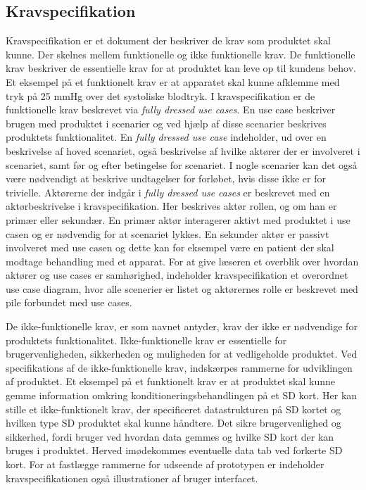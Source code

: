 	\subsection{Kravspecifikation} \label{title:kravspecifikation}
	Kravspecifikation er et dokument der beskriver de krav som produktet skal kunne. Der skelnes mellem funktionelle og ikke funktionelle krav. De funktionelle krav beskriver de essentielle krav for at produktet kan leve op til kundens behov. Et eksempel på et funktionelt krav er at apparatet skal kunne afklemme med tryk på 25 mmHg over det systoliske blodtryk. I kravspecifikation er de funktionelle krav beskrevet via \textit{fully dressed use cases}. En use case beskriver brugen med produktet i scenarier og ved hjælp af disse scenarier beskrives produktets funktionalitet. En \textit{fully dressed use case} indeholder, ud over en beskrivelse af hoved scenariet, også beskrivelse af hvilke aktører der er involveret i scenariet, samt før og efter betingelse for scenariet. I nogle scenarier kan det også være nødvendigt at beskrive undtagelser for forløbet, hvis disse ikke er for trivielle. Aktørerne der indgår i \textit{fully dressed use cases} er beskrevet med en aktørbeskrivelse i kravspecifikation. Her beskrives aktør rollen, og om han er primær eller sekundær. En primær aktør interagerer aktivt med produktet i use casen og er nødvendig for at scenariet lykkes. En sekunder aktør er passivt involveret med use casen og dette kan for eksempel være en patient der skal modtage behandling med et apparat. For at give læseren et overblik over hvordan aktører og use cases er samhørighed, indeholder kravspecifikation et overordnet use case diagram, hvor alle scenerier er listet og aktørernes rolle er beskrevet med pile forbundet med use cases. 
	
	De ikke-funktionelle krav, er som navnet antyder, krav der ikke er nødvendige for produktets funktionalitet. Ikke-funktionelle krav er essentielle for brugervenligheden, sikkerheden og muligheden for at vedligeholde produktet. Ved specifikations af de ikke-funktionelle krav, indskærpes rammerne for udviklingen af produktet. Et eksempel på et funktionelt krav er at produktet skal kunne gemme information omkring konditioneringsbehandlingen på et SD kort. Her kan stille et ikke-funktionelt krav, der specificeret datastrukturen på SD kortet og hvilken type SD produktet skal kunne håndtere. Det sikre brugervenlighed og sikkerhed, fordi bruger ved hvordan data gemmes og hvilke SD kort der kan bruges i produktet. Herved imødekommes eventuelle data tab ved forkerte SD kort. For at fastlægge rammerne for udseende af prototypen er indeholder kravspecifikationen også illustrationer af bruger interfacet. 
	
